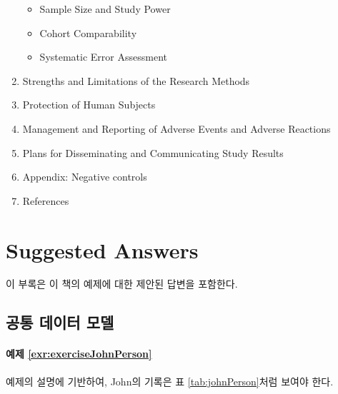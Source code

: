 \documentclass[11pt]{book}
\providecommand{\tightlist}{%
  \setlength{\itemsep}{0pt}\setlength{\parskip}{0pt}}
\theoremstyle{definition}
\theoremstyle{definition}
\theoremstyle{definition}
\theoremstyle{remark}
\begin{document}
\begin{enumerate}
  \begin{itemize}
  \tightlist
  \item
    Sample Size and Study Power\\
  \item
    Cohort Comparability\\
  \item
    Systematic Error Assessment\\
  \end{itemize}
\item
  Strengths and Limitations of the Research Methods\\
\item
  Protection of Human Subjects\\
\item
  Management and Reporting of Adverse Events and Adverse Reactions\\
\item
  Plans for Disseminating and Communicating Study Results
\item
  Appendix: Negative controls
\item
  References
\end{enumerate}

\chapter{Suggested Answers}\label{SuggestedAnswers}

이 부록은 이 책의 예제에 대한 제안된 답변을 포함한다.

\section{공통 데이터 모델}\label{Cdmanswers}

\subsubsection*{예제
\ref{exr:exerciseJohnPerson}}\label{-refexrexercisejohnperson}

예제의 설명에 기반하여, John의 기록은 표 \ref{tab:johnPerson}처럼 보여야
한다.
\end{document}
